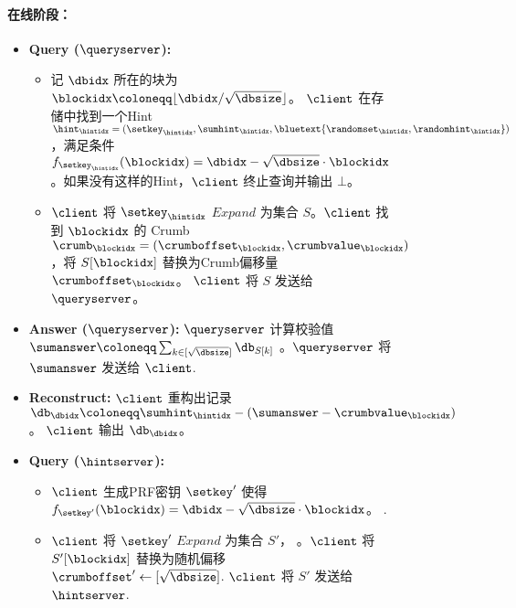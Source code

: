 \begin{figure*}
\begin{mdframed}
        \paragraph{在线阶段：}
        \begin{itemize}
            \item \textbf{Query ($\queryserver$):}
                  \begin{itemize}
                      \item 记 $\dbidx$ 所在的块为 $\blockidx\coloneqq \lfloor \dbidx/\sqrt{\dbsize}\rfloor$。 $\client$ 在存储中找到一个Hint $\hint_\hintidx = (\setkey_\hintidx,\sumhint_\hintidx,\bluetext{\randomset_\hintidx,\randomhint_\hintidx})$，满足条件 $f_{\setkey_\hintidx}(\blockidx) = \dbidx-\sqrt{\dbsize}\cdot \blockidx$。如果没有这样的Hint，$\client$ 终止查询并输出 $\bot$。
                      \item $\client$ 将 $\setkey_\hintidx$ $Expand$ 为集合 $S$。$\client$ 找到 $\blockidx$ 的 Crumb $\crumb_\blockidx=(\crumboffset_\blockidx, \crumbvalue_\blockidx)$，将 $S[\blockidx]$ 替换为Crumb偏移量 $\crumboffset_\blockidx$。  $\client$ 将 $S$  发送给 $\queryserver$。
                  \end{itemize}
            \item \textbf{Answer ($\queryserver$):} $\queryserver$ 计算校验值 $\sumanswer\coloneqq \sum_{k\in [\sqrt{\dbsize}]}\db_{S[k]}$ 。$\queryserver$ 将 $\sumanswer$  发送给 $\client$.
            \item \textbf{Reconstruct:} $\client$ 重构出记录 $\db_\dbidx \coloneqq  \sumhint_\hintidx-(\sumanswer-\crumbvalue_\blockidx)$。  $\client$ 输出 $\db_\dbidx$。
            \item \textbf{Query ($\hintserver$):}
                  \begin{itemize}
                      \item $\client$ 生成PRF密钥 $\setkey'$ 使得 $f_{\setkey'}(\blockidx) = \dbidx-\sqrt{\dbsize}\cdot \blockidx$。 .
                      \item $\client$ 将 $\setkey'$ $Expand$ 为集合 $S'$， 。$\client$ 将 $S'[\blockidx]$ 替换为随机偏移 $\crumboffset' \leftarrow [\sqrt{\dbsize}]$. $\client$ 将 $S'$ 发送给 $\hintserver$.

\end{itemize}
\end{itemize}
\end{mdframed}
\end{figure*}
